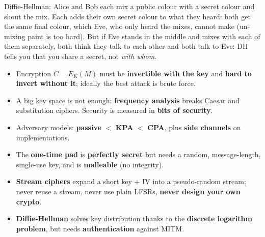 \begin{goatbox}
Diffie-Hellman: Alice and Bob each mix a public colour with a secret colour and shout the mix.
Each adds their own secret colour to what they heard: both get the same final colour, which Eve,
who only heard the mixes, cannot make (un-mixing paint is too hard). But if Eve stands in the
middle and mixes with each of them separately, both think they talk to each other and both talk
to Eve: DH tells you that you share a secret, not \emph{with whom}.
\end{goatbox}

\begin{keybox}[title=Summary]
\begin{itemize}
  \item Encryption $C = E_K(M)$ must be \textbf{invertible with the key} and \textbf{hard
        to invert without it}; ideally the best attack is brute force.
  \item A big key space is not enough: \textbf{frequency analysis} breaks Caesar and
        substitution ciphers. Security is measured in \textbf{bits of security}.
  \item Adversary models: \textbf{passive} $<$ \textbf{KPA} $<$ \textbf{CPA}, plus
        \textbf{side channels} on implementations.
  \item The \textbf{one-time pad} is \textbf{perfectly secret} but needs a random,
        message-length, single-use key, and is \textbf{malleable} (no integrity).
  \item \textbf{Stream ciphers} expand a short key + IV into a pseudo-random stream;
        never reuse a stream, never use plain LFSRs, \textbf{never design your own
        crypto}.
  \item \textbf{Diffie-Hellman} solves key distribution thanks to the \textbf{discrete
        logarithm problem}, but needs \textbf{authentication} against MITM.
\end{itemize}
\end{keybox}

